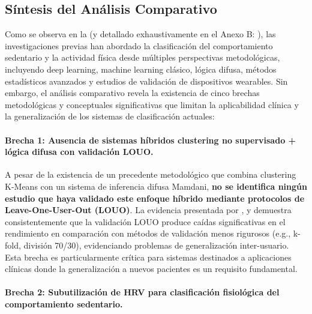 \subsection{Síntesis del Análisis Comparativo}
\label{subsec:sintesis_comparativa}

Como se observa en la  (y detallado exhaustivamente en el Anexo B: ), las investigaciones previas han abordado la clasificación del comportamiento sedentario y la actividad física desde múltiples perspectivas metodológicas, incluyendo deep learning, machine learning clásico, lógica difusa, métodos estadísticos avanzados y estudios de validación de dispositivos wearables. Sin embargo, el análisis comparativo revela la existencia de cinco brechas metodológicas y conceptuales significativas que limitan la aplicabilidad clínica y la generalización de los sistemas de clasificación actuales:

\paragraph{Brecha 1: Ausencia de sistemas híbridos clustering no supervisado + lógica difusa con validación LOUO.}

A pesar de la existencia de un precedente metodológico \cite{Goncalves2021} que combina clustering K-Means con un sistema de inferencia difusa Mamdani, \textbf{no se identifica ningún estudio que haya validado este enfoque híbrido mediante protocolos de Leave-One-User-Out (LOUO)}. La evidencia presentada por \cite{Rehman2024LOSO}, \cite{Mathew2024LOSO} y \cite{Bassani2025DLHAR} demuestra consistentemente que la validación LOUO produce caídas significativas en el rendimiento en comparación con métodos de validación menos rigurosos (e.g., k-fold, división 70/30), evidenciando problemas de generalización inter-usuario. Esta brecha es particularmente crítica para sistemas destinados a aplicaciones clínicas donde la generalización a nuevos pacientes es un requisito fundamental.

\paragraph{Brecha 2: Subutilización de HRV para clasificación fisiológica del comportamiento sedentario.}

